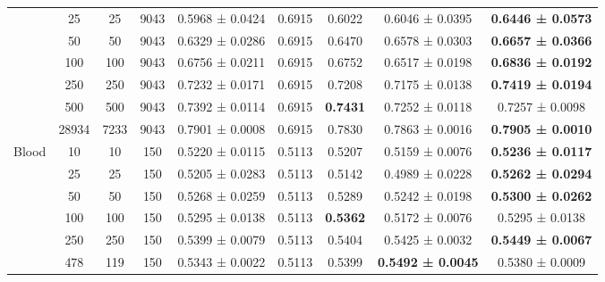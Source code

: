 \begin{table}
{\begin{tabular}[H]{@{}lcccccccc@{}}
                              & 25    & 25   & 9043 & 0.5968 ± 0.0424      & 0.6915               & 0.6022          & 0.6046 ± 0.0395          & \textbf{0.6446 ± 0.0573} \\
                              & 50    & 50   & 9043 & 0.6329 ± 0.0286      & 0.6915               & 0.6470          & 0.6578 ± 0.0303          & \textbf{0.6657 ± 0.0366} \\
                              & 100   & 100  & 9043 & 0.6756 ± 0.0211      & 0.6915               & 0.6752          & 0.6517 ± 0.0198          & \textbf{0.6836 ± 0.0192} \\
                              & 250   & 250  & 9043 & 0.7232 ± 0.0171      & 0.6915               & 0.7208          & 0.7175 ± 0.0138          & \textbf{0.7419 ± 0.0194} \\
                              & 500   & 500  & 9043 & 0.7392 ± 0.0114      & 0.6915               & \textbf{0.7431} & 0.7252 ± 0.0118          & 0.7257 ± 0.0098          \\
                              & 28934 & 7233 & 9043 & 0.7901 ± 0.0008      & 0.6915               & 0.7830          & 0.7863 ± 0.0016          & \textbf{0.7905 ± 0.0010} \\
                              \midrule
\multirow{6}{*}{Blood}        & 10    & 10   & 150  & 0.5220 ± 0.0115      & 0.5113               & 0.5207          & 0.5159 ± 0.0076          & \textbf{0.5236 ± 0.0117} \\
                              & 25    & 25   & 150  & 0.5205 ± 0.0283      & 0.5113               & 0.5142          & 0.4989 ± 0.0228          & \textbf{0.5262 ± 0.0294} \\
                              & 50    & 50   & 150  & 0.5268 ± 0.0259      & 0.5113               & 0.5289          & 0.5242 ± 0.0198          & \textbf{0.5300 ± 0.0262} \\
                              & 100   & 100  & 150  & 0.5295 ± 0.0138      & 0.5113               & \textbf{0.5362} & 0.5172 ± 0.0076          & 0.5295 ± 0.0138          \\
                              & 250   & 250  & 150  & 0.5399 ± 0.0079      & 0.5113               & 0.5404          & 0.5425 ± 0.0032          & \textbf{0.5449 ± 0.0067} \\
                              & 478   & 119  & 150  & 0.5343 ± 0.0022      & 0.5113               & 0.5399          & \textbf{0.5492 ± 0.0045} & 0.5380 ± 0.0009          \\
                              \midrule

\end{tabular}}
\end{table}
